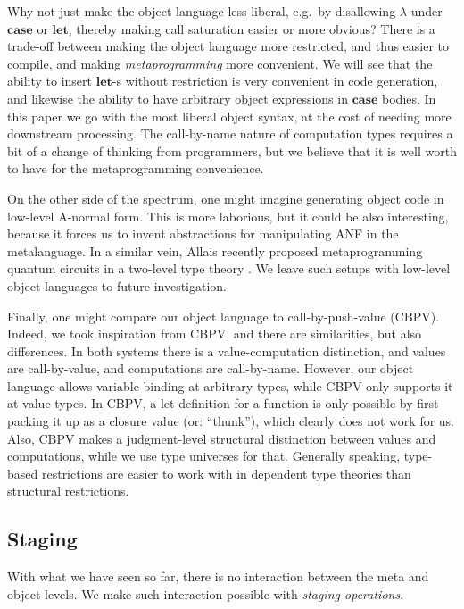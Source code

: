 \documentclass[acmsmall,screen,review,anonymous]{acmart}
\newcommand{\mbf}[1]{\mathbf{#1}}
\theoremstyle{remark}
\begin{document}
Why not just make the object language less liberal, e.g.\ by disallowing
$\lambda$ under $\mbf{case}$ or $\mbf{let}$, thereby making call saturation
easier or more obvious? There is a trade-off between making the object language
more restricted, and thus easier to compile, and making \emph{metaprogramming}
more convenient. We will see that the ability to insert $\mbf{let}$-s without
restriction is very convenient in code generation, and likewise the ability to
have arbitrary object expressions in $\mbf{case}$ bodies. In this paper we go
with the most liberal object syntax, at the cost of needing more downstream
processing. The call-by-name nature of computation types requires a bit of a
change of thinking from programmers, but we believe that it is well worth to
have for the metaprogramming convenience.

On the other side of the spectrum, one might imagine generating object code in
low-level A-normal form. This is more laborious, but it could be also
interesting, because it forces us to invent abstractions for manipulating ANF in
the metalanguage. In a similar vein, Allais recently proposed metaprogramming
quantum circuits in a two-level type theory \cite{TODO}. We leave such setups
with low-level object languages to future investigation.

Finally, one might compare our object language to call-by-push-value
(CBPV). Indeed, we took inspiration from CBPV, and there are similarities, but
also differences. In both systems there is a value-computation distinction, and
values are call-by-value, and computations are call-by-name. However, our object
language allows variable binding at arbitrary types, while CBPV only supports it
at value types. In CBPV, a let-definition for a function is only possible by
first packing it up as a closure value (or: ``thunk''), which clearly does not
work for us.  Also, CBPV makes a judgment-level structural distinction between
values and computations, while we use type universes for that. Generally
speaking, type-based restrictions are easier to work with in dependent type
theories than structural restrictions.

\subsection{Staging}\label{sec:staging}

With what we have seen so far, there is no interaction between the meta and
object levels. We make such interaction possible with \emph{staging operations}.
\end{document}
